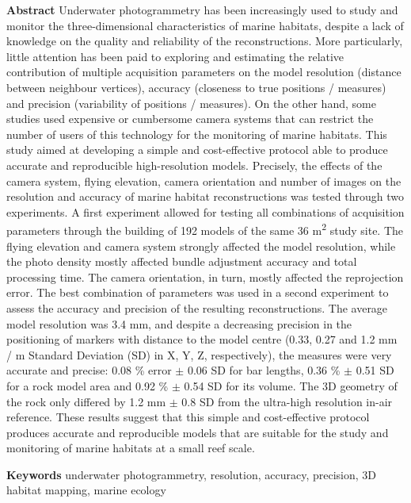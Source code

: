 \noindent\textbf{Abstract}
Underwater photogrammetry has been increasingly used to study and monitor the three-dimensional characteristics of marine habitats, despite a lack of knowledge on the quality and reliability of the reconstructions. More particularly, little attention has been paid to exploring and estimating the relative contribution of multiple acquisition parameters on the model resolution (distance between neighbour vertices), accuracy (closeness to true positions / measures) and precision (variability of positions / measures). On the other hand, some studies used expensive or cumbersome camera systems that can restrict the number of users of this technology for the monitoring of marine habitats. This study aimed at developing a simple and cost-effective protocol able to produce accurate and reproducible high-resolution models. Precisely, the effects of the camera system, flying elevation, camera orientation and number of images on the resolution and accuracy of marine habitat reconstructions was tested through two experiments. A first experiment allowed for testing all combinations of acquisition parameters through the building of 192 models of the same 36 m\textsuperscript{2} study site. The flying elevation and camera system strongly affected the model resolution, while the photo density mostly affected bundle adjustment accuracy and total processing time. The camera orientation, in turn, mostly affected the reprojection error. The best combination of parameters was used in a second experiment to assess the accuracy and precision of the resulting reconstructions. The average model resolution was 3.4 mm, and despite a decreasing precision in the positioning of markers with distance to the model centre (0.33, 0.27 and 1.2 mm / m Standard Deviation (SD) in X, Y, Z, respectively), the measures were very accurate and precise: 0.08 \% error $\pm$ 0.06 SD for bar lengths, 0.36 \% $\pm$ 0.51 SD for a rock model area and 0.92 \% $\pm$ 0.54 SD for its volume. The 3D geometry of the rock only differed by 1.2 mm $\pm$ 0.8 SD from the ultra-high resolution in-air reference. These results suggest that this simple and cost-effective protocol produces accurate and reproducible models that are suitable for the study and monitoring of marine habitats at a small reef scale.

\medskip
\noindent\textbf{Keywords}
underwater photogrammetry, resolution, accuracy, precision, 3D habitat mapping, marine ecology

